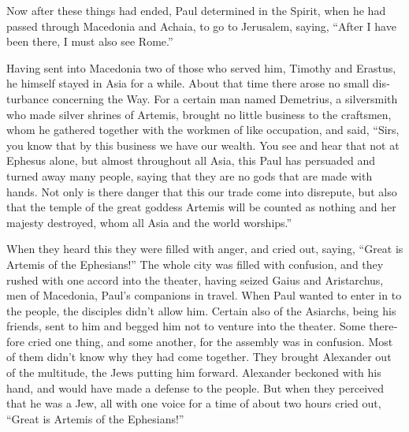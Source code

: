 \begin{paracol}{2}
\begin{otherlanguage}{english}
 Now after these things had ended, Paul determined in the
Spirit, when he had passed through Macedonia and Achaia, to go to
Jerusalem, saying, ``After I have been there, I must also see Rome.''

 Having sent into Macedonia two of those who served him,
Timothy and Erastus, he himself stayed in Asia for a while.
 About that time there arose no small disturbance
concerning the Way.  For a certain man named Demetrius, a
silversmith who made silver shrines of Artemis, brought no little
business to the craftsmen,  whom he gathered together
with the workmen of like occupation, and said, ``Sirs, you know that by
this business we have our wealth.  You see and hear that
not at Ephesus alone, but almost throughout all Asia, this Paul has
persuaded and turned away many people, saying that they are no gods that
are made with hands.  Not only is there danger that this
our trade come into disrepute, but also that the temple of the great
goddess Artemis will be counted as nothing and her majesty destroyed,
whom all Asia and the world worships.''

 When they heard this they were filled with anger, and
cried out, saying, ``Great is Artemis of the Ephesians!''
 The whole city was filled with confusion, and they
rushed with one accord into the theater, having seized Gaius and
Aristarchus, men of Macedonia, Paul's companions in travel.
 When Paul wanted to enter in to the people, the
disciples didn't allow him.  Certain also of the
Asiarchs, being his friends, sent to him and begged him not to venture
into the theater.  Some therefore cried one thing, and
some another, for the assembly was in confusion. Most of them didn't
know why they had come together.  They brought Alexander
out of the multitude, the Jews putting him forward. Alexander beckoned
with his hand, and would have made a defense to the people.
 But when they perceived that he was a Jew, all with one
voice for a time of about two hours cried out, ``Great is Artemis of the
Ephesians!''


\end{otherlanguage}
\end{paracol}
